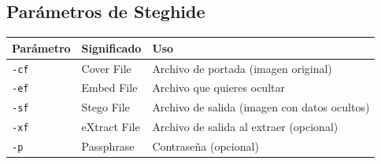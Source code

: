 \documentclass[11pt,a4paper]{article}
\begin{document}
\subsection{Parámetros de Steghide}

\begin{table}[h]
\centering
\begin{tabular}{|l|l|l|}
\hline
\textbf{Parámetro} & \textbf{Significado} & \textbf{Uso} \\
\hline
\texttt{-cf} & Cover File & Archivo de portada (imagen original) \\
\hline
\texttt{-ef} & Embed File & Archivo que quieres ocultar \\
\hline
\texttt{-sf} & Stego File & Archivo de salida (imagen con datos ocultos) \\
\hline
\texttt{-xf} & eXtract File & Archivo de salida al extraer (opcional) \\
\hline
\texttt{-p} & Passphrase & Contraseña (opcional) \\
\hline
\end{tabular}
\end{table}
\end{document}
